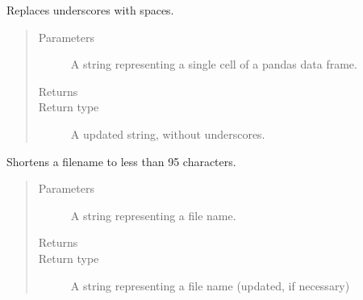 \documentclass[letterpaper,10pt,english]{sphinxmanual}
\begin{document}
\begin{fulllineitems}
\label{\detokenize{index:ListManagement.utility.general.remove_underscores}}
Replaces underscores with spaces.
\begin{quote}\begin{description}
\item[{Parameters}] \leavevmode
{} \textendash{} A string representing a single cell of a pandas data frame.

\item[{Returns}] \leavevmode


\item[{Return type}] \leavevmode
A updated string, without underscores.

\end{description}\end{quote}

\end{fulllineitems}


\begin{fulllineitems}
\label{\detokenize{index:ListManagement.utility.general.save_conf_creation_meta}}
\end{fulllineitems}


\begin{fulllineitems}
\label{\detokenize{index:ListManagement.utility.general.shorten_fname_to_95chars}}
Shortens a filename to less than 95 characters.
\begin{quote}\begin{description}
\item[{Parameters}] \leavevmode
{} \textendash{} A string representing a file name.

\item[{Returns}] \leavevmode


\item[{Return type}] \leavevmode
A string representing a file name (updated, if necessary)

\end{description}\end{quote}

\end{fulllineitems}
\end{document}
